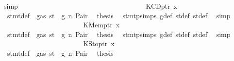 \begin{isabellebody}
\ simp\isanewline
\ \ \ \ \ \ \ \ \ \ \ \ \isamarkupfalse%
\isanewline
\ \ \ \ \ \ \ \ \ \ \isamarkupfalse%
\isanewline
\ \ \ \ \ \ \ \ \ \ \ \ \isamarkupfalse%
\ {\isacharparenleft}{\kern0pt}KCDptr\ x{}{\isacharparenright}{\kern0pt}\isanewline
\ \ \ \ \ \ \ \ \ \ \ \ \isamarkupfalse%
\ {}{\isacharparenleft}{\kern0pt}{}{\isacharparenright}{\kern0pt}\ stmt{\isacharunderscore}{\kern0pt}def\ {\isacharbackquoteopen}{\isasymnot}\ gas\ st\ {\isasymle}\ g{\isacharbackquoteclose}\ n\ Pair\ \isamarkupfalse%
\ {\isacharquery}{\kern0pt}thesis\ \isamarkupfalse%
\ stmt{\isachardot}{\kern0pt}psimps{\isacharparenleft}{\kern0pt}{}{\isacharparenright}{\kern0pt}\ g{\isacharunderscore}{\kern0pt}def\ st{\isacharprime}{\kern0pt}{\isacharunderscore}{\kern0pt}def\ st{\isacharprime}{\kern0pt}{\isacharprime}{\kern0pt}{\isacharunderscore}{\kern0pt}def\ \isamarkupfalse%
\ simp\isanewline
\ \ \ \ \ \ \ \ \ \ \isamarkupfalse%
\isanewline
\ \ \ \ \ \ \ \ \ \ \ \ \isamarkupfalse%
\ {\isacharparenleft}{\kern0pt}KMemptr\ x{}{\isacharparenright}{\kern0pt}\isanewline
\ \ \ \ \ \ \ \ \ \ \ \ \isamarkupfalse%
\ {}{\isacharparenleft}{\kern0pt}{}{\isacharparenright}{\kern0pt}\ stmt{\isacharunderscore}{\kern0pt}def\ {\isacharbackquoteopen}{\isasymnot}\ gas\ st\ {\isasymle}\ g{\isacharbackquoteclose}\ n\ Pair\ \isamarkupfalse%
\ {\isacharquery}{\kern0pt}thesis\ \isamarkupfalse%
\ stmt{\isachardot}{\kern0pt}psimps{\isacharparenleft}{\kern0pt}{}{\isacharparenright}{\kern0pt}\ g{\isacharunderscore}{\kern0pt}def\ st{\isacharprime}{\kern0pt}{\isacharunderscore}{\kern0pt}def\ st{\isacharprime}{\kern0pt}{\isacharprime}{\kern0pt}{\isacharunderscore}{\kern0pt}def\ \isamarkupfalse%
\ simp\isanewline
\ \ \ \ \ \ \ \ \ \ \isamarkupfalse%
\isanewline
\ \ \ \ \ \ \ \ \ \ \ \ \isamarkupfalse%
\ {\isacharparenleft}{\kern0pt}KStoptr\ x{}{\isacharparenright}{\kern0pt}\isanewline
\ \ \ \ \ \ \ \ \ \ \ \ \isamarkupfalse%
\ {}{\isacharparenleft}{\kern0pt}{}{\isacharparenright}{\kern0pt}\ stmt{\isacharunderscore}{\kern0pt}def\ {\isacharbackquoteopen}{\isasymnot}\ gas\ st\ {\isasymle}\ g{\isacharbackquoteclose}\ n\ Pair\ \isamarkupfalse%
\ {\isacharquery}{\kern0pt}thesis\ \isamarkupfalse%

\end{isabellebody}
